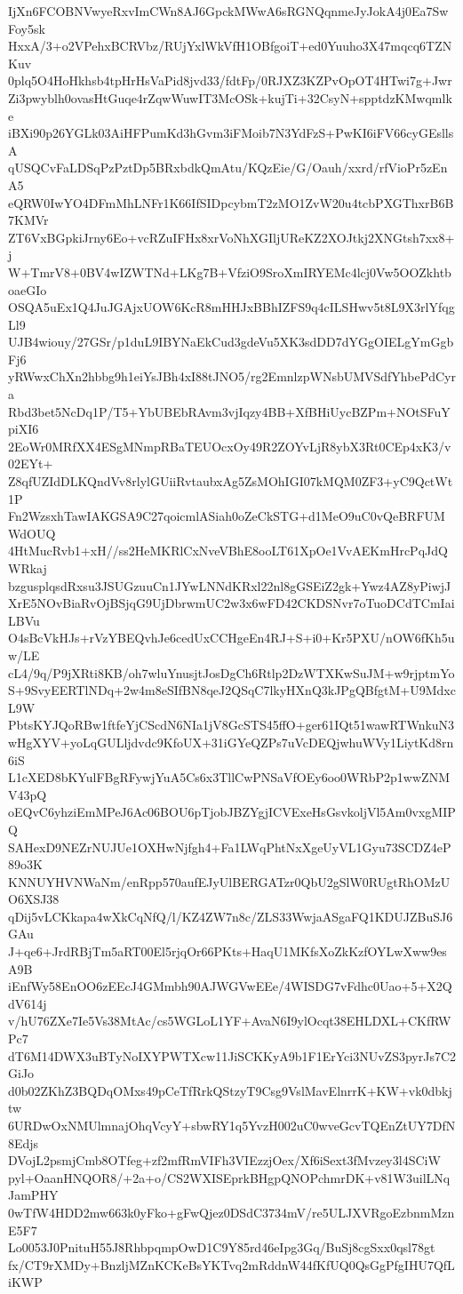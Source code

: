 IjXn6FCOBNVwyeRxvImCWn8AJ6GpckMWwA6sRGNQqnmeJyJokA4j0Ea7SwFoy5sk
HxxA/3+o2VPehxBCRVbz/RUjYxlWkVfH1OBfgoiT+ed0Yuuho3X47mqcq6TZNKuv
0plq5O4HoHkhsb4tpHrHsVaPid8jvd33/fdtFp/0RJXZ3KZPvOpOT4HTwi7g+Jwr
Zi3pwyblh0ovasHtGuqe4rZqwWuwIT3McOSk+kujTi+32CsyN+spptdzKMwqmlke
iBXi90p26YGLk03AiHFPumKd3hGvm3iFMoib7N3YdFzS+PwKI6iFV66cyGEsllsA
qUSQCvFaLDSqPzPztDp5BRxbdkQmAtu/KQzEie/G/Oauh/xxrd/rfVioPr5zEnA5
eQRW0IwYO4DFmMhLNFr1K66IfSIDpcybmT2zMO1ZvW20u4tcbPXGThxrB6B7KMVr
ZT6VxBGpkiJrny6Eo+vcRZuIFHx8xrVoNhXGIljUReKZ2XOJtkj2XNGtsh7xx8+j
W+TmrV8+0BV4wIZWTNd+LKg7B+VfziO9SroXmIRYEMc4lcj0Vw5OOZkhtboaeGIo
OSQA5uEx1Q4JuJGAjxUOW6KcR8mHHJxBBhIZFS9q4cILSHwv5t8L9X3rlYfqgLl9
UJB4wiouy/27GSr/p1duL9IBYNaEkCud3gdeVu5XK3sdDD7dYGgOIELgYmGgbFj6
yRWwxChXn2hbbg9h1eiYsJBh4xI88tJNO5/rg2EmnlzpWNsbUMVSdfYhbePdCyra
Rbd3bet5NcDq1P/T5+YbUBEbRAvm3vjIqzy4BB+XfBHiUycBZPm+NOtSFuYpiXI6
2EoWr0MRfXX4ESgMNmpRBaTEUOcxOy49R2ZOYvLjR8ybX3Rt0CEp4xK3/v02EYt+
Z8qfUZIdDLKQndVv8rlylGUiiRvtaubxAg5ZsMOhIGI07kMQM0ZF3+yC9QctWt1P
Fn2WzsxhTawIAKGSA9C27qoicmlASiah0oZeCkSTG+d1MeO9uC0vQeBRFUMWdOUQ
4HtMucRvb1+xH//ss2HeMKRlCxNveVBhE8ooLT61XpOe1VvAEKmHrcPqJdQWRkaj
bzgusplqsdRxsu3JSUGzuuCn1JYwLNNdKRxl22nl8gGSEiZ2gk+Ywz4AZ8yPiwjJ
XrE5NOvBiaRvOjBSjqG9UjDbrwmUC2w3x6wFD42CKDSNvr7oTuoDCdTCmIaiLBVu
O4sBcVkHJs+rVzYBEQvhJe6cedUxCCHgeEn4RJ+S+i0+Kr5PXU/nOW6fKh5uw/LE
cL4/9q/P9jXRti8KB/oh7wluYnusjtJosDgCh6Rtlp2DzWTXKwSuJM+w9rjptmYo
S+9SvyEERTlNDq+2w4m8eSIfBN8qeJ2QSqC7lkyHXnQ3kJPgQBfgtM+U9MdxcL9W
PbtsKYJQoRBw1ftfeYjCScdN6NIa1jV8GcSTS45ffO+ger61IQt51wawRTWnkuN3
wHgXYV+yoLqGULljdvdc9KfoUX+31iGYeQZPs7uVcDEQjwhuWVy1LiytKd8rn6iS
L1cXED8bKYulFBgRFywjYuA5Cs6x3TllCwPNSaVfOEy6oo0WRbP2p1wwZNMV43pQ
oEQvC6yhziEmMPeJ6Ac06BOU6pTjobJBZYgjICVExeHsGsvkoljVl5Am0vxgMIPQ
SAHexD9NEZrNUJUe1OXHwNjfgh4+Fa1LWqPhtNxXgeUyVL1Gyu73SCDZ4eP89o3K
KNNUYHVNWaNm/enRpp570aufEJyUlBERGATzr0QbU2gSlW0RUgtRhOMzUO6XSJ38
qDij5vLCKkapa4wXkCqNfQ/l/KZ4ZW7n8c/ZLS33WwjaASgaFQ1KDUJZBuSJ6GAu
J+qe6+JrdRBjTm5aRT00El5rjqOr66PKts+HaqU1MKfsXoZkKzfOYLwXww9esA9B
iEnfWy58EnOO6zEEcJ4GMmbh90AJWGVwEEe/4WISDG7vFdhc0Uao+5+X2QdV614j
v/hU76ZXe7Ie5Vs38MtAc/cs5WGLoL1YF+AvaN6I9ylOcqt38EHLDXL+CKfRWPc7
dT6M14DWX3uBTyNoIXYPWTXcw11JiSCKKyA9b1F1ErYci3NUvZS3pyrJs7C2GiJo
d0b02ZKhZ3BQDqOMxs49pCeTfRrkQStzyT9Csg9VslMavElnrrK+KW+vk0dbkjtw
6URDwOxNMUlmnajOhqVcyY+sbwRY1q5YvzH002uC0wveGcvTQEnZtUY7DfN8Edjs
DVojL2psmjCmb8OTfeg+zf2mfRmVIFh3VIEzzjOex/Xf6iSext3fMvzey3l4SCiW
pyl+OaanHNQOR8/+2a+o/CS2WXISEprkBHgpQNOPchmrDK+v81W3uilLNqJamPHY
0wTfW4HDD2mw663k0yFko+gFwQjez0DSdC3734mV/re5ULJXVRgoEzbnmMznE5F7
Lo0053J0PnituH55J8RhbpqmpOwD1C9Y85rd46eIpg3Gq/BuSj8cgSxx0qsl78gt
fx/CT9rXMDy+BnzljMZnKCKeBsYKTvq2mRddnW44fKfUQ0QsGgPfgIHU7QfLiKWP
